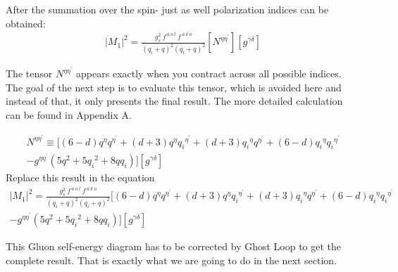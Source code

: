After the summation over the spin- just as well polarization indices can be obtained:
\begin{equation}
\begin{split}
|M_1|^2=\frac{g_s^2 \:f^{\:a\:o\:l}\: f^{\:a\:k\:o}}{(q_i +q)^2 (q_i +q)^2} [N^{{\eta}{{\eta}^{\prime}}}][g^{{\gamma}{\delta}}]
\end{split}
\end{equation}

The tensor $N^{{\eta}{{\eta}^{\prime}}}$ appears exactly when you contract across all possible indices.\\
The goal of the next step is to evaluate this tensor, which is avoided here and instead of that, it only presents the final result. The more detailed calculation can be found in Appendix A.

\begin{equation}
\begin{split}
N^{{\eta}{{\eta}^{\prime}}}\equiv [(6-d){q}^{{\eta}}{q}^{{\eta}^{\prime}}+(d+3){q}^{{\eta}}{q_i}^{{\eta}^{\prime}}+(d+3){q_i}^{{\eta}}{q}^{{\eta}^{\prime}}+(6-d){q_i}^{{\eta}}{q_i}^{{\eta}^{\prime}}\\
-g^{{\eta}{{\eta}^{\prime}}}(5{q}^2+5{q_i}^2+8qq_i)][g^{{\gamma}{\delta}}]
\end{split}
\end{equation}
Replace this result in the equation
\begin{equation}
\begin{split}
|M_1|^2=\frac{g_s^2 \:f^{\:a\:o\:l}\: f^{\:a\:k\:o}}{(q_i +q)^2 (q_i +q)^2} [(6-d){q}^{{\eta}}{q}^{{\eta}^{\prime}}+(d+3){q}^{{\eta}}{q_i}^{{\eta}^{\prime}}+(d+3){q_i}^{{\eta}}{q}^{{\eta}^{\prime}}+(6-d){q_i}^{{\eta}}{q_i}^{{\eta}^{\prime}}\\
-g^{{\eta}{{\eta}^{\prime}}}(5{q}^2+5{q_i}^2+8qq_i)][g^{{\gamma}{\delta}}]
\end{split}
\end{equation}

This Gluon self-energy diagram has to be corrected by Ghost Loop to get the complete result. That is exactly what we are going to do in the next section.

\pagebreak
